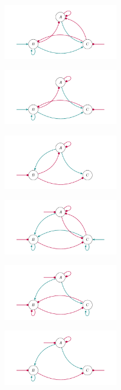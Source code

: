 \documentclass[varwidth=18cm, border=10pt]{standalone}
\begin{document}
\begin{figure}
\begin{subfigure}{6cm}
\centering\includegraphics[width=5cm]{mmmopopmpppom.pdf}
\caption{}
\end{subfigure}
\begin{subfigure}{6cm}
\centering\includegraphics[width=5cm]{mmoopopmpppom.pdf}
\caption{}
\end{subfigure}
\begin{subfigure}{6cm}
\centering\includegraphics[width=5cm]{mmooppoompmoo.pdf}
\caption{}
\end{subfigure}
\begin{subfigure}{6cm}
\centering\includegraphics[width=5cm]{mommppppmmmpp.pdf}
\caption{}
\end{subfigure}
\begin{subfigure}{6cm}
\centering\includegraphics[width=5cm]{moomppmmmpmpo.pdf}
\caption{}
\end{subfigure}
\begin{subfigure}{6cm}
\centering\includegraphics[width=5cm]{moompppompmom.pdf}

\end{subfigure}
\end{figure}
\end{document}
